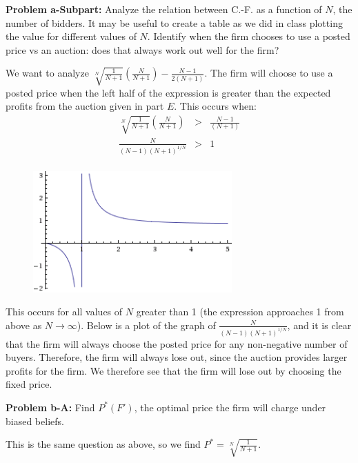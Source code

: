 \documentclass[psamsfonts]{amsart}
\newenvironment{sol}{\vspace{0.25cm}{\large \bfseries Solution:}}{\qedsymbol}
\newenvironment{prob}[1]{\begin{framed}{\large \bfseries Problem #1:}}{\end{framed}}
\begin{document}
\begin{prob}{a-Subpart}
Analyze the relation between C.-F. as a function of $N$, the number of bidders. It may be useful to create a table as we did in class plotting the value for different values of $N$. Identify when the firm chooses to use a posted price vs an auction: does that always work out well for the firm?
\end{prob}

\begin{sol}
We want to analyze $\sqrt[N]{\frac{1}{N+1}} \left(\frac{N}{N+1}\right) - \frac{N-1}{2(N+1)}$. The firm will choose to use a posted price when the left half of the expression is greater than the expected profits from the auction given in part $E$. This occurs when:
\begin{eqnarray}
\sqrt[N]{\frac{1}{N+1}} \left(\frac{N}{N+1}\right) &>& \frac{N-1}{(N+1)} \\
\frac{N}{(N-1)(N+1)^{1/N}} &>& 1 \\
\end{eqnarray}

\begin{figure}[h!]
\includegraphics[width=3in]{ps2_analytical_graph.png}
\end{figure}

This occurs for all values of $N$ greater than 1 (the expression approaches 1 from above as $N \to \infty$). Below is a plot of the graph of $\frac{N}{(N-1)(N+1)^{1/N}}$, and it is clear that the firm will always choose the posted price for any non-negative number of buyers. Therefore, the firm will always lose out, since the auction provides larger profits for the firm. We therefore see that the firm will lose out by choosing the fixed price. 
\end{sol}

\begin{prob}{b-A}
Find $P^*(F')$, the optimal price the firm will charge under biased beliefs.
\end{prob}
\begin{sol}
This is the same question as above, so we find $P^* = \sqrt[N]{\frac{1}{N+1}}$. 
\end{sol}
\end{document}
